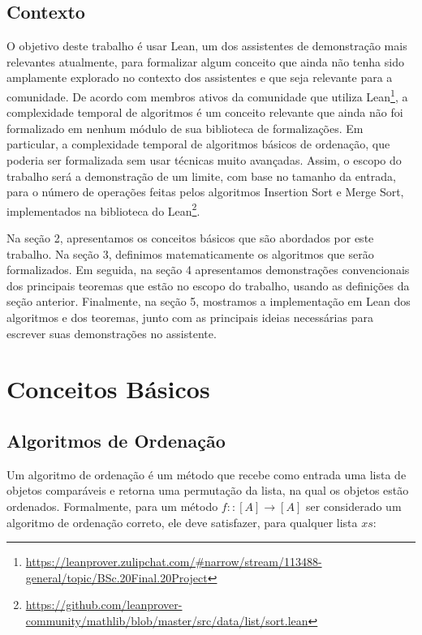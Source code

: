 \documentclass[12pt, oneside, a4paper,english,brazil]{abntex2}
\begin{document}
\section{Contexto}

\qquad O objetivo deste trabalho \'e usar Lean, um dos assistentes de demonstra\c{c}\~ao
mais relevantes atualmente, para formalizar algum conceito que ainda n\~ao tenha sido
amplamente explorado no contexto dos assistentes e que seja relevante para a comunidade.
De acordo com membros ativos da comunidade  que
utiliza
Lean\footnote{\url{https://leanprover.zulipchat.com/\#narrow/stream/113488-general/topic/BSc.20Final.20Project}}, a complexidade temporal de algoritmos é um conceito relevante que
ainda não foi formalizado em nenhum módulo de sua biblioteca de formaliza\c{c}\~oes.
Em particular, a complexidade temporal de algoritmos básicos de ordenação, que poderia ser
formalizada sem usar técnicas muito avançadas. Assim, o escopo do trabalho será
a demonstração de um limite, com base no tamanho da entrada, para o número de
operações feitas pelos algoritmos Insertion Sort e Merge Sort, implementados na
biblioteca do
Lean\footnote{\url{https://github.com/leanprover-community/mathlib/blob/master/src/data/list/sort.lean}}.

\qquad Na se\c{c}\~ao 2, apresentamos os conceitos b\'asicos que s\~ao abordados por este trabalho.
Na se\c{c}\~ao 3, definimos matematicamente
os algoritmos que ser\~ao formalizados. Em seguida, na se\c{c}\~ao 4 apresentamos
demonstra\c{c}\~oes convencionais dos principais teoremas que est\~ao no escopo
do trabalho, usando as defini\c{c}\~oes da se\c{c}\~ao anterior. Finalmente,
na se\c{c}\~ao 5, mostramos a implementa\c{c}\~ao em Lean dos algoritmos e dos teoremas,
junto com as principais ideias necess\'arias para escrever suas demonstra\c{c}\~oes
no assistente.

\chapter{Conceitos B\'asicos}
\section{Algoritmos de Ordena\c{c}\~ao}
\qquad Um algoritmo de ordena\c{c}\~ao \'e um m\'etodo que recebe como entrada uma lista de objetos
compar\'aveis e retorna uma permuta\c{c}\~ao da lista, na qual os objetos est\~ao ordenados. Formalmente,
para um m\'etodo $f :: [A] \rightarrow [A]$ ser considerado um algoritmo de ordena\c{c}\~ao correto, ele deve
satisfazer, para qualquer lista $xs$:
\end{document}
